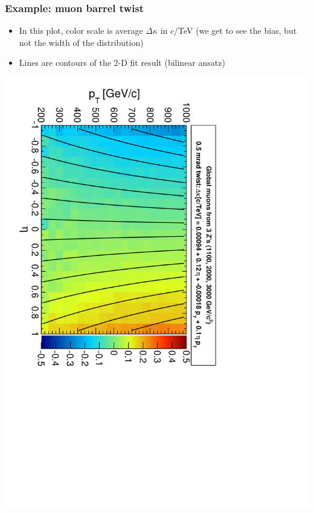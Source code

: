 \documentclass[compress]{beamer}
\begin{document}
\begin{frame}
\frametitle{Example: muon barrel twist}
\begin{itemize}
\item In this plot, color scale is average $\Delta\kappa$ in $c$/TeV (we get to see the bias, but not the width of the distribution)
\item Lines are contours of the 2-D fit result (bilinear ansatz)
\end{itemize}
\begin{center}
\includegraphics[height=0.9\linewidth, angle=90]{trackdistort2d_twist0_5mrad_GlobalMuons2.pdf}
\end{center}
\end{frame}
\end{document}
